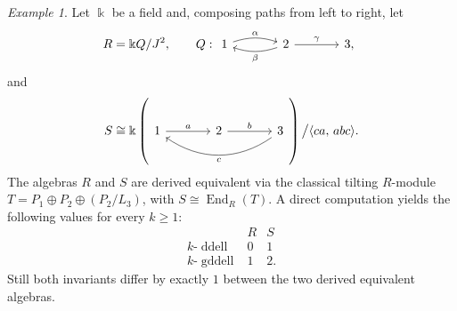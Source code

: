 \documentclass[12pt,a4paper,reqno]{amsart}
\theoremstyle{plain}
\theoremstyle{definition}
\theoremstyle{remark}
\newtheorem{example}[theorem]{Example}
\DeclareMathOperator{\modd}{mod}
\DeclareMathOperator{\End}{End}
\DeclareMathOperator{\ddell}{ddell}
\DeclareMathOperator{\gddell}{gddell}
\newcommand{\Db}{\mathcal{D}^b}
\begin{document}
\begin{example}
Let $\Bbbk$ be a field and, composing paths from left to right, let
\[
R=\Bbbk Q/J^2,
\qquad
Q:
\begin{tikzcd}[column sep=3.6em]
1 \arrow[r,bend left=18,"\alpha"]
&2 \arrow[l,bend left=18,"\beta"]\arrow[r,"\gamma"]
&3,
\end{tikzcd}
\] 
and 
\[
S\cong
\Bbbk
\left(
\begin{tikzcd}[column sep=3.6em]
1\arrow[r,"a"]&2\arrow[r,"b"]&3\arrow[ll,bend left=35,"c"]
\end{tikzcd}
\right)
\big/\langle ca,\,abc\rangle.
\]
The algebras $R$ and $S$ are derived equivalent  via the classical tilting $R$-module $T=P_1\oplus P_2\oplus (P_2/L_3)$, with $S\cong\End_R(T)$.
A direct computation yields the following values for every $k\ge 1$:
\[
\begin{array}{c|cc}
 & R & S \\ \hline
k\text{-}\ddell & 0 & 1\\
k\text{-}\gddell & 1 & 2.
\end{array}
\]
Still both invariants differ by exactly $1$ between the two derived equivalent algebras.
\end{example}


\end{document}
